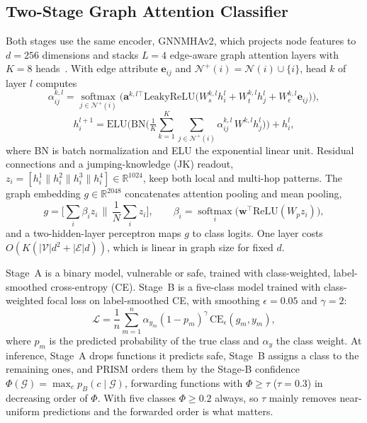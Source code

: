\documentclass[runningheads]{llncs}
\begin{document}
\subsection{Two-Stage Graph Attention Classifier}
\label{sec:ranker}

Both stages use the same encoder, GNNMHAv2, which projects node features to $d=256$ dimensions and stacks $L=4$ edge-aware graph attention layers with $K=8$ heads~\cite{velivckovic2017graph,brody2021attentive}. With edge attribute $\mathbf{e}_{ij}$ and $\mathcal{N}^{+}(i)=\mathcal{N}(i)\cup\{i\}$, head $k$ of layer $l$ computes
\begin{equation}
\alpha_{ij}^{k,l}=\operatorname*{softmax}_{j\in\mathcal{N}^{+}(i)}\Big(\mathbf{a}^{k,l\top}\mathrm{LeakyReLU}\big(W_{s}^{k,l}h_i^{l}+W_{t}^{k,l}h_j^{l}+W_{e}^{k,l}\mathbf{e}_{ij}\big)\Big),
\end{equation}
\begin{equation}
h_i^{l+1}=\mathrm{ELU}\Big(\mathrm{BN}\Big(\tfrac{1}{K}\textstyle\sum_{k=1}^{K}\sum_{j\in\mathcal{N}^{+}(i)}\alpha_{ij}^{k,l}\,W^{k,l}h_j^{l}\Big)\Big)+h_i^{l},
\end{equation}
where BN is batch normalization and ELU the exponential linear unit. Residual connections and a jumping-knowledge (JK) readout, $z_i=[h_i^{1}\|h_i^{2}\|h_i^{3}\|h_i^{4}]\in\mathbb{R}^{1024}$, keep both local and multi-hop patterns. The graph embedding $g\in\mathbb{R}^{2048}$ concatenates attention pooling and mean pooling,
\begin{equation}
g=\Big[\textstyle\sum_{i}\beta_i z_i \,\Big\|\, \frac{1}{N}\sum_i z_i\Big],\qquad \beta_i=\operatorname*{softmax}_i\big(\mathbf{w}^{\top}\mathrm{ReLU}(W_p z_i)\big),
\end{equation}
and a two-hidden-layer perceptron maps $g$ to class logits. One layer costs $O(K(|\mathcal{V}|d^2+|\mathcal{E}|d))$, which is linear in graph size for fixed $d$.

Stage~A is a binary model, vulnerable or safe, trained with class-weighted, label-smoothed cross-entropy (CE). Stage~B is a five-class model trained with class-weighted focal loss on label-smoothed CE, with smoothing $\epsilon=0.05$ and $\gamma=2$:
\begin{equation}
\mathcal{L}=\frac{1}{n}\sum_{m=1}^{n}\alpha_{y_m}(1-p_{m})^{\gamma}\,\mathrm{CE}_{\epsilon}(g_m,y_m),
\end{equation}
where $p_m$ is the predicted probability of the true class and $\alpha_{y}$ the class weight. At inference, Stage~A drops functions it predicts safe, Stage~B assigns a class to the remaining ones, and PRISM orders them by the Stage-B confidence $\Phi(\mathcal{G})=\max_c p_B(c\mid\mathcal{G})$, forwarding functions with $\Phi\ge\tau$ ($\tau=0.3$) in decreasing order of $\Phi$. With five classes $\Phi\ge0.2$ always, so $\tau$ mainly removes near-uniform predictions and the forwarded order is what matters.
\end{document}
